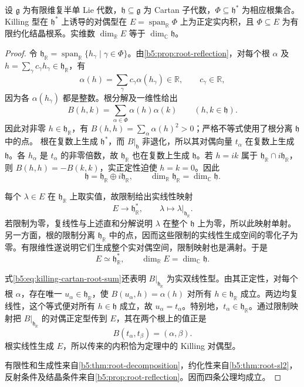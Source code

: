 \begin{theorem}\label{b5:thm:root-system}
	设 \(\mathfrak g\) 为有限维复半单 Lie 代数，\(\mathfrak h\subseteq\mathfrak g\) 为 Cartan 子代数，\(\Phi\subseteq\mathfrak h^*\) 为相应根集合。Killing 型在 \(\mathfrak h^*\) 上诱导的对偶型在 \(E=\operatorname{span}_{\mathbb R}\Phi\) 上为正定实内积，且 \(\Phi\subseteq E\) 为有限约化结晶根系。实维数 \(\dim_{\mathbb R}E\) 等于 \(\dim_{\mathbb C}\mathfrak h\)。
\end{theorem}
\begin{proof}
	令 \(\mathfrak h_{\mathbb R}=\operatorname{span}_{\mathbb R}\{h_\gamma\mid\gamma\in\Phi\}\)。由\cref{b5:prop:root-reflection}，对每个根 \(\alpha\) 及 \(h=\sum_\gamma c_\gamma h_\gamma\in\mathfrak h_{\mathbb R}\)，有
	\[
		\alpha(h)=\sum_\gamma c_\gamma\alpha(h_\gamma)\in\mathbb R, \qquad c_\gamma\in\mathbb R,
	\]
	因为各 \(\alpha(h_\gamma)\) 都是整数。根分解及一维性给出
	\begin{equation}\label{b5:eq:killing-cartan-root-sum}
		B(h,k)=\sum_{\alpha\in\Phi}\alpha(h)\alpha(k) \qquad(h,k\in\mathfrak h).
	\end{equation}
	因此对非零 \(h\in\mathfrak h_{\mathbb R}\)，有 \(B(h,h)=\sum_\alpha\alpha(h)^2>0\)；严格不等式使用了根分离 \(\mathfrak h\) 中的点。 根在复数上生成 \(\mathfrak h^*\)，而 \(B|_{\mathfrak h}\) 非退化，所以其对偶向量 \(t_\alpha\) 在复数上生成 \(\mathfrak h\)。各 \(h_\alpha\) 是 \(t_\alpha\) 的非零倍数，故 \(\mathfrak h_{\mathbb R}\) 也在复数上生成 \(\mathfrak h\)。若 \(h=ik\) 属于 \(\mathfrak h_{\mathbb R}\cap i\mathfrak h_{\mathbb R}\)，则 \(B(h,h)=-B(k,k)\)，实正定性迫使 \(h=k=0\)。因此
	\[
		\mathfrak h=\mathfrak h_{\mathbb R}\oplus i\mathfrak h_{\mathbb R}, \qquad \dim_{\mathbb R}\mathfrak h_{\mathbb R}=\dim_{\mathbb C}\mathfrak h.
	\]

	每个 \(\lambda\in E\) 在 \(\mathfrak h_{\mathbb R}\) 上取实值，故限制给出实线性映射
	\[
		E\longrightarrow\mathfrak h_{\mathbb R}^*, \qquad\lambda\longmapsto\lambda|_{\mathfrak h_{\mathbb R}}.
	\]
	若限制为零，复线性与上述直和分解说明 \(\lambda\) 在整个 \(\mathfrak h\) 上为零，所以此映射单射。另一方面，根的限制分离 \(\mathfrak h_{\mathbb R}\) 中的点，因而这些限制的实线性生成空间的零化子为零。有限维性遂说明它们生成整个实对偶空间，限制映射也是满射。于是
	\[
		E\simeq\mathfrak h_{\mathbb R}^*, \qquad\dim_{\mathbb R}E=\dim_{\mathbb C}\mathfrak h.
	\]

	式\eqref{b5:eq:killing-cartan-root-sum}还表明 \(B|_{\mathfrak h_{\mathbb R}}\) 为实双线性型。由其正定性，对每个根 \(\alpha\)，存在唯一 \(u_\alpha\in\mathfrak h_{\mathbb R}\)，使 \(B(u_\alpha,h)=\alpha(h)\) 对所有 \(h\in\mathfrak h_{\mathbb R}\) 成立。两边均复线性，这个等式便对所有 \(h\in\mathfrak h\) 成立，故 \(u_\alpha=t_\alpha\)。特别地，\(t_\alpha\in\mathfrak h_{\mathbb R}\)。通过限制映射把 \(B|_{\mathfrak h_{\mathbb R}}\) 的对偶正定型传到 \(E\)，其在两个根上的值正是
	\[
		B(t_\alpha,t_\beta)=(\alpha,\beta).
	\]
	根实线性生成 \(E\)，所以传来的内积恰为定理中的 Killing 对偶型。

	有限性和生成性来自\cref{b5:thm:root-decomposition}，约化性来自\cref{b5:thm:root-sl2}，反射条件及结晶条件来自\cref{b5:prop:root-reflection}。因而四条公理均成立。
\end{proof}


